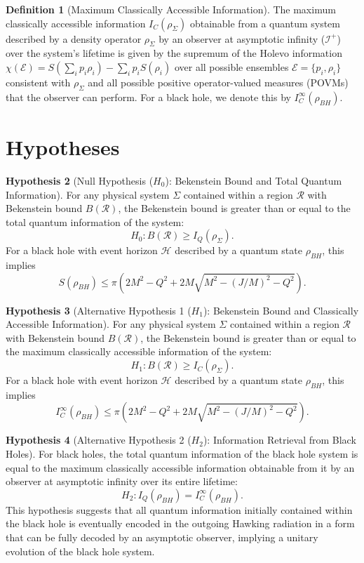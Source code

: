 \documentclass{article}
\theoremstyle{definition}
\newtheorem{definition}{Definition}[section]
\newtheorem{hypothesis}[definition]{Hypothesis}
\begin{document}
	\begin{definition}[Maximum Classically Accessible Information]
		The maximum classically accessible information $I_C(\rho_\Sigma)$ obtainable from a quantum system described by a density operator $\rho_\Sigma$ by an observer at asymptotic infinity ($\mathcal{I}^+$) over the system's lifetime is given by the supremum of the Holevo information $\chi(\mathcal{E}) = S(\sum_i p_i \rho_i) - \sum_i p_i S(\rho_i)$ over all possible ensembles $\mathcal{E} = \{p_i, \rho_i\}$ consistent with $\rho_\Sigma$ and all possible positive operator-valued measures (POVMs) that the observer can perform. For a black hole, we denote this by $I_C^{\infty}(\rho_{BH})$.
	\end{definition}
	
	\section{Hypotheses}
	
	\begin{hypothesis}[Null Hypothesis ($H_0$): Bekenstein Bound and Total Quantum Information]
		For any physical system $\Sigma$ contained within a region $\mathcal{R}$ with Bekenstein bound $B(\mathcal{R})$, the Bekenstein bound is greater than or equal to the total quantum information of the system:
		$$H_0: B(\mathcal{R}) \ge I_Q(\rho_\Sigma).$$
		For a black hole with event horizon $\mathcal{H}$ described by a quantum state $\rho_{BH}$, this implies
		$$S(\rho_{BH}) \le \pi \left( 2 M^2 - Q^2 + 2 M \sqrt{M^2 - (J/M)^2 - Q^2} \right).$$
	\end{hypothesis}
	
	\begin{hypothesis}[Alternative Hypothesis 1 ($H_1$): Bekenstein Bound and Classically Accessible Information]
		For any physical system $\Sigma$ contained within a region $\mathcal{R}$ with Bekenstein bound $B(\mathcal{R})$, the Bekenstein bound is greater than or equal to the maximum classically accessible information of the system:
		$$H_1: B(\mathcal{R}) \ge I_C(\rho_\Sigma).$$
		For a black hole with event horizon $\mathcal{H}$ described by a quantum state $\rho_{BH}$, this implies
		$$I_C^{\infty}(\rho_{BH}) \le \pi \left( 2 M^2 - Q^2 + 2 M \sqrt{M^2 - (J/M)^2 - Q^2} \right).$$
	\end{hypothesis}
	
	\begin{hypothesis}[Alternative Hypothesis 2 ($H_2$): Information Retrieval from Black Holes]
		For black holes, the total quantum information of the black hole system is equal to the maximum classically accessible information obtainable from it by an observer at asymptotic infinity over its entire lifetime:
		$$H_2: I_Q(\rho_{BH}) = I_C^{\infty}(\rho_{BH}).$$
		This hypothesis suggests that all quantum information initially contained within the black hole is eventually encoded in the outgoing Hawking radiation in a form that can be fully decoded by an asymptotic observer, implying a unitary evolution of the black hole system.
	\end{hypothesis}
	
\end{document}
